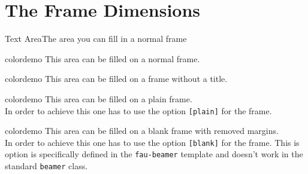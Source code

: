 \section{The Frame Dimensions}
%
%
%
%
\begin{frame}[t]{Text Area}{The area you can fill in a normal frame}

	\begin{beamercolorbox}[dp=0pt,sep=5em,wd=\textwidth,ht=\FrameHeight,center]{colordemo}%
		This area can be filled on a normal frame.
	\end{beamercolorbox}%
\end{frame}
%
%
%
\begin{frame}

	\begin{beamercolorbox}[dp=0pt,sep=5em,
			wd=\textwidth,
			ht=\dimexpr\FrameHeight+\TitleHeight+4mm,center]{colordemo}%
		This area can be filled on a frame without a title.
	\end{beamercolorbox}%
\end{frame}
%
%
%
%
%
\begin{frame}[plain]
	\begin{beamercolorbox}[dp=0pt,sep=5em,wd=\textwidth,ht=\paperheight,center]{colordemo}%
		This area can be filled on a plain frame.\\
		In order to achieve this one has to use the option \texttt{[plain]} for the frame.
	\end{beamercolorbox}%
\end{frame}
%
%
%
%
%
\begin{frame}[blank]
	\begin{beamercolorbox}[dp=0pt,sep=5em,wd=\textwidth,ht=\paperheight,center]{colordemo}%
		This area can be filled on a blank frame with removed margins.\\
		In order to achieve this one has to use the option \texttt{[blank]} for the frame. This is option
		is specifically defined in the \texttt{fau-beamer} template and doesn't work in the standard
		\texttt{beamer} class.
	\end{beamercolorbox}%
\end{frame}
%
%
%
%
%
